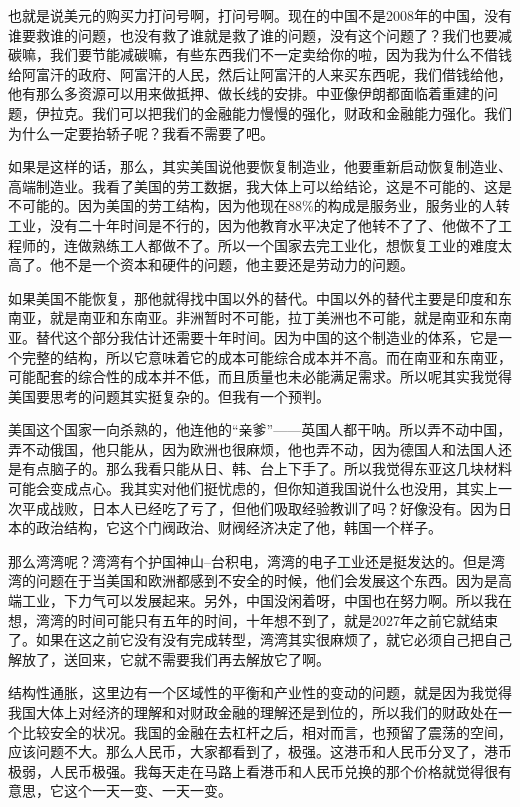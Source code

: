 \documentclass[UTF8, 12pt, a4paper]{ctexrep}
\begin{document}
也就是说美元的购买力打问号啊，打问号啊。现在的中国不是2008年的中国，没有谁要救谁的问题，也没有救了谁就是救了谁的问题，没有这个问题了？我们也要减碳嘛，我们要节能减碳嘛，有些东西我们不一定卖给你的啦，因为我为什么不借钱给阿富汗的政府、阿富汗的人民，然后让阿富汗的人来买东西呢，我们借钱给他，他有那么多资源可以用来做抵押、做长线的安排。中亚像伊朗都面临着重建的问题，伊拉克。我们可以把我们的金融能力慢慢的强化，财政和金融能力强化。我们为什么一定要抬轿子呢？我看不需要了吧。

如果是这样的话，那么，其实美国说他要恢复制造业，他要重新启动恢复制造业、高端制造业。我看了美国的劳工数据，我大体上可以给结论，这是不可能的、这是不可能的。因为美国的劳工结构，因为他现在88\%的构成是服务业，服务业的人转工业，没有二十年时间是不行的，因为他教育水平决定了他转不了了、他做不了工程师的，连做熟练工人都做不了。所以一个国家去完工业化，想恢复工业的难度太高了。他不是一个资本和硬件的问题，他主要还是劳动力的问题。

如果美国不能恢复，那他就得找中国以外的替代。中国以外的替代主要是印度和东南亚，就是南亚和东南亚。非洲暂时不可能，拉丁美洲也不可能，就是南亚和东南亚。替代这个部分我估计还需要十年时间。因为中国的这个制造业的体系，它是一个完整的结构，所以它意味着它的成本可能综合成本并不高。而在南亚和东南亚，可能配套的综合性的成本并不低，而且质量也未必能满足需求。所以呢其实我觉得美国要思考的问题其实挺复杂的。但我有一个预判。

美国这个国家一向杀熟的，他连他的“亲爹”——英国人都干呐。所以弄不动中国，弄不动俄国，他只能从，因为欧洲也很麻烦，他也弄不动，因为德国人和法国人还是有点脑子的。那么我看只能从日、韩、台上下手了。所以我觉得东亚这几块材料可能会变成点心。我其实对他们挺忧虑的，但你知道我国说什么也没用，其实上一次平成战败，日本人已经吃了亏了，但他们吸取经验教训了吗？好像没有。因为日本的政治结构，它这个门阀政治、财阀经济决定了他，韩国一个样子。

那么湾湾呢？湾湾有个护国神山--台积电，湾湾的电子工业还是挺发达的。但是湾湾的问题在于当美国和欧洲都感到不安全的时候，他们会发展这个东西。因为是高端工业，下力气可以发展起来。另外，中国没闲着呀，中国也在努力啊。所以我在想，湾湾的时间可能只有五年的时间，十年想不到了，就是2027年之前它就结束了。如果在这之前它没有没有完成转型，湾湾其实很麻烦了，就它必须自己把自己解放了，送回来，它就不需要我们再去解放它了啊。

结构性通胀，这里边有一个区域性的平衡和产业性的变动的问题，就是因为我觉得我国大体上对经济的理解和对财政金融的理解还是到位的，所以我们的财政处在一个比较安全的状况。我国的金融在去杠杆之后，相对而言，也预留了震荡的空间，应该问题不大。那么人民币，大家都看到了，极强。这港币和人民币分叉了，港币极弱，人民币极强。我每天走在马路上看港币和人民币兑换的那个价格就觉得很有意思，它这个一天一变、一天一变。
\end{document}
